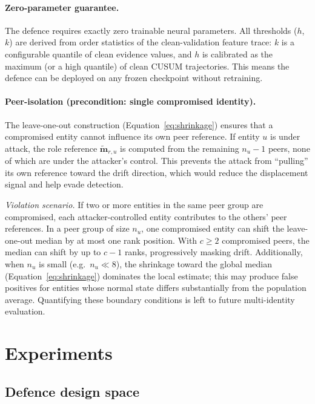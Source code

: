 \documentclass[10pt,twocolumn]{article}
\begin{document}
\paragraph{Zero-parameter guarantee.}  The defence requires exactly zero
trainable neural parameters.  All thresholds ($h$, $k$) are derived from
order statistics of the clean-validation feature trace: $k$ is a
configurable quantile of clean evidence values, and $h$ is calibrated as
the maximum (or a high quantile) of clean CUSUM trajectories.  This means
the defence can be deployed on any frozen checkpoint without retraining.

\paragraph{Peer-isolation (precondition: single compromised identity).}
The leave-one-out construction
(Equation~\ref{eq:shrinkage}) ensures that a compromised entity cannot
influence its own peer reference.  If entity $u$ is under attack, the
role reference $\widetilde{\mathbf{m}}_{r,u}$ is computed from the
remaining $n_u - 1$ peers, none of which are under the attacker's control.
This prevents the attack from
``pulling'' its own reference toward the drift direction, which would
reduce the displacement signal and help evade detection.

\emph{Violation scenario.}  If two or more entities in the same peer
group are compromised, each attacker-controlled entity contributes to the
others' peer references.  In a peer group of size $n_u$, one compromised
entity can shift the leave-one-out median by at most one rank position.
With $c \geq 2$ compromised peers, the median can shift by up to $c-1$
ranks, progressively masking drift.  Additionally, when $n_u$ is small
(e.g.\ $n_u \ll 8$), the shrinkage toward the global median
(Equation~\ref{eq:shrinkage}) dominates the local estimate; this may
produce false positives for entities whose normal state differs
substantially from the population average.  Quantifying these boundary
conditions is left to future multi-identity evaluation.

\section{Experiments}
\label{sec:experiments}

\subsection{Defence design space}
\label{sec:design-space}
\end{document}
